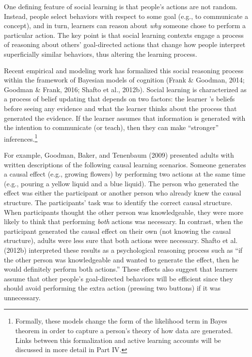 \documentclass[english,floatsintext,man]{apa6}
\theoremstyle{definition}
\theoremstyle{definition}
\theoremstyle{definition}
\theoremstyle{remark}
\begin{document}
One defining feature of social learning is that people's actions are not
random. Instead, people select behaviors with respect to some goal
(e.g., to communicate a concept), and in turn, learners can reason about
\emph{why} someone chose to perform a particular action. The key point
is that social learning contexts engage a process of reasoning about
others' goal-directed actions that change how people interpret
superficially similar behaviors, thus altering the learning process.

Recent empirical and modeling work has formalized this social reasoning
process within the framework of Bayesian models of cognition (Frank \&
Goodman, 2014; Goodman \& Frank, 2016; Shafto et al., 2012b). Social
learning is characterized as a process of belief updating that depends
on two factors: the learner 's beliefs before seeing any evidence and
what the learner thinks about the process that generated the evidence.
If the learner assumes that information is generated with the intention
to communicate (or teach), then they can make \enquote{stronger}
inferences.\footnote{Formally, these models change the form of the
  likelihood term in Bayes theorem in order to capture a person's theory
  of how data are generated. Links between this formalization and active
  learning accounts will be discussed in more detail in Part IV.}

For example, Goodman, Baker, and Tenenbaum (2009) presented adults with
written descriptions of the following causal learning scenarios. Someone
generates a causal effect (e.g., growing flowers) by performing two
actions at the same time (e.g., pouring a yellow liquid and a blue
liquid). The person who generated the effect was either the participant
or another person who already knew the causal structure. The
participants' task was to identify the correct causal structure. When
participants thought the other person was knowledgeable, they were more
likely to think that performing \emph{both} actions was necessary. In
contrast, when the participant generated the causal effect on their own
(not knowing the causal structure), adults were less sure that both
actions were necessary. Shafto et al. (2012b) interpreted these results
as a psychological reasoning process such as \enquote{if the other
person was knowledgeable and wanted to generate the effect, then he
would definitely perform both actions.} These effects also suggest that
learners assume that other people's goal-directed behaviors will be
efficient since they should avoid performing the extra action (pressing
two buttons) if it was unnecessary.
\end{document}
